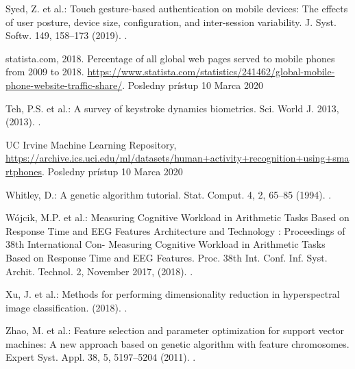 \documentclass[runningheads]{llncs}
\begin{document}
\begin{thebibliography}{8}
Syed, Z. et al.: Touch gesture-based authentication on mobile devices: The effects of user posture, device size, configuration, and inter-session variability. J. Syst. Softw. 149, 158–173 (2019). .

statista.com, 2018. Percentage of all global web pages served to mobile phones from 2009 to 2018. \url{https://www.statista.com/statistics/241462/global-mobile-phone-website-traffic-share/}. Posledny prístup 10 Marca 2020

Teh, P.S. et al.: A survey of keystroke dynamics biometrics. Sci. World J. 2013, (2013). .

UC Irvine Machine Learning Repository, \url{https://archive.ics.uci.edu/ml/datasets/human+activity+recognition+using+smartphones}. Posledny prístup 10 Marca 2020

Whitley, D.: A genetic algorithm tutorial. Stat. Comput. 4, 2, 65–85 (1994). .

Wójcik, M.P. et al.: Measuring Cognitive Workload in Arithmetic Tasks Based on Response Time and EEG Features Architecture and Technology : Proceedings of 38th International Con- Measuring Cognitive Workload in Arithmetic Tasks Based on Response Time and EEG Features. Proc. 38th Int. Conf. Inf. Syst. Archit. Technol. 2, November 2017, (2018). .

Xu, J. et al.: Methods for performing dimensionality reduction in hyperspectral image classification. (2018). .

Zhao, M. et al.: Feature selection and parameter optimization for support vector machines: A new approach based on genetic algorithm with feature chromosomes. Expert Syst. Appl. 38, 5, 5197–5204 (2011). .

\end{thebibliography}
\end{document}
